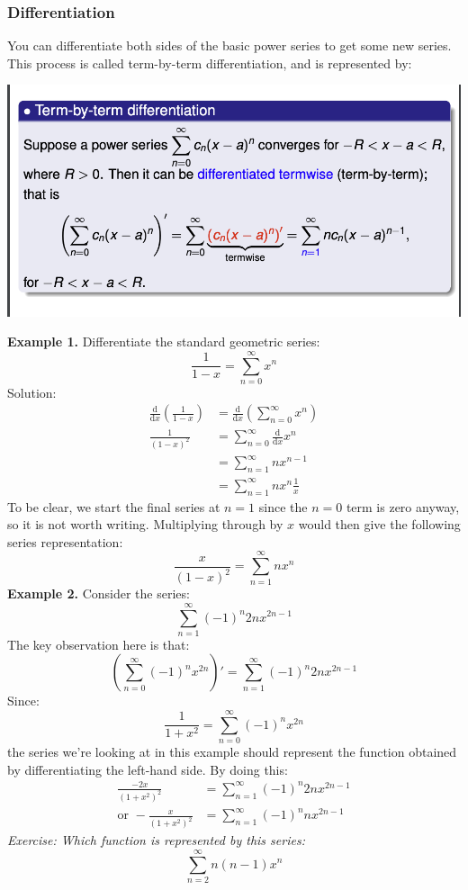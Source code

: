 \documentclass{article}
\begin{document}
\subsubsection{Differentiation}
You can differentiate both sides of the basic power series to get some new series. This process is called term-by-term differentiation, and is represented by: 
\begin{center}
        \includegraphics[scale = 0.7]{differentiation.png}
\end{center}
\textbf{Example 1. } Differentiate the standard geometric series: 
$$ \frac{1}{1-x} = \sum_{n=0}^{\infty} x^n$$
Solution: 
\begin{align*}
     \frac{\mathrm{d} }{\mathrm{d} x} \left(\frac{1}{1-x}\right) &=  \frac{\mathrm{d} }{\mathrm{d} x} \left(\sum_{n=0}^{\infty} x^n \right) \\
     \frac{1}{(1-x)^2} &=\sum_{n=0}^{\infty} \frac{\mathrm{d} }{\mathrm{d} x} x^n \\
     &= \sum_{n=1}^{\infty} nx^{n-1} \\
     &= \sum_{n=1}^{\infty} nx^n\frac{1}{x}
\end{align*}
To be clear, we start the final series at $n=1$ since the $n=0$ term is zero anyway, so it is not worth writing. Multiplying through by $x$ would then give the following series representation: 
$$ \frac{x}{(1-x)^2} = \sum_{n=1}^{\infty} nx^n$$
\textbf{Example 2.} Consider the series: 
$$ \sum_{n=1}^{\infty} (-1)^n 2nx^{2n-1}$$
The key observation here is that: 
$$ \left(\sum_{n=0}^{\infty} (-1)^n x^{2n} \right)' = \sum_{n=1}^{\infty} (-1)^n2nx^{2n-1}$$
Since:
$$ \frac{1}{1+x^2} = \sum_{n=0}^{\infty} (-1)^n x^{2n}$$
the series we're looking at in this example should represent the function obtained  by differentiating the left-hand side. By doing this: 
\begin{align*}
    \frac{-2x}{(1+x^2)^2} &= \sum_{n=1}^{\infty} (-1)^n2nx^{2n-1} \\ 
    \text{or }-\frac{x}{(1+x^2)^2} &=  \sum_{n=1}^{\infty} (-1)^nnx^{2n-1}
\end{align*}
\textit{Exercise: Which function is represented by this series: }
$$ \sum_{n=2}^{\infty} n(n-1)x^n$$
\end{document}
